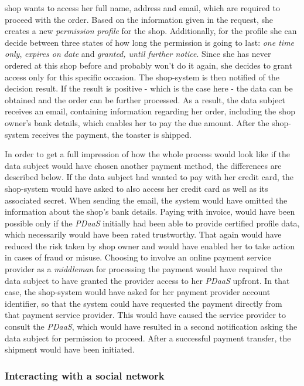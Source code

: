\documentclass[12pt,english,a4paper,titlepage,cleardoublepage=empty,dottedtoc]{report}
\begin{document}
shop wants to access her full name, address and email, which are
required to proceed with the order. Based on the information given in
the request, she creates a new \emph{permission profile} for the shop.
Additionally, for the profile she can decide between three states of how
long the permission is going to last: \emph{one time only},
\emph{expires on date} and \emph{granted, until further notice}. Since
she has never ordered at this shop before and probably won't do it
again, she decides to grant access only for this specific occasion. The
shop-system is then notified of the decision result. If the result is
positive - which is the case here - the data can be obtained and the
order can be further processed. As a result, the data subject receives
an email, containing information regarding her order, including the shop
owner's bank details, which enables her to pay the due amount. After the
shop-system receives the payment, the toaster is shipped.

In order to get a full impression of how the whole process would look
like if the data subject would have chosen another payment method, the
differences are described below. If the data subject had wanted to pay
with her credit card, the shop-system would have asked to also access
her credit card as well as its associated secret. When sending the
email, the system would have omitted the information about the shop's
bank details. Paying with invoice, would have been possible only if the
\emph{PDaaS} initially had been able to provide certified profile data,
which necessarily would have been rated trustworthy. That again would
have reduced the risk taken by shop owner and would have enabled her to
take action in cases of fraud or misuse. Choosing to involve an online
payment service provider as a \emph{middleman} for processing the
payment would have required the data subject to have granted the
provider access to her \emph{PDaaS} upfront. In that case, the
shop-system would have asked for her payment provider account
identifier, so that the system could have requested the payment directly
from that payment service provider. This would have caused the service
provider to consult the \emph{PDaaS}, which would have resulted in a
second notification asking the data subject for permission to proceed.
After a successful payment transfer, the shipment would have been
initiated.

\subsubsection*{Interacting with a social
network}\label{interacting-with-a-social-network}
\end{document}
